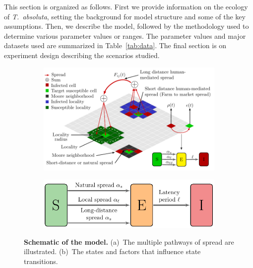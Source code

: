\documentclass[11pt]{article}
\newcommand{\tuta}{\emph{T.~absoluta}}
\theoremstyle{definition}
\begin{document}
This section is organized as follows. First we provide information on the
ecology of \tuta{}, setting the background for model structure and
some of the key assumptions. Then, we describe the model, followed by the
methodology used to determine various parameter values or ranges.  The
parameter values and major datasets used are summarized in
Table~\ref{tab:data}. The final section is on experiment design describing
the scenarios studied.
\begin{figure}[ht]
    \centering
    \begin{subfigure}[b]{.6\textwidth}
    \includegraphics[width=\textwidth]{figs/model_schematic.pdf}
    \caption{\label{fig:modelConcept}}
    \end{subfigure}
    \begin{subfigure}[b]{.37\textwidth}
    \includegraphics[width=\textwidth]{figs/SEI.pdf}
    \caption{\label{fig:SEI}}
    \end{subfigure}
    \caption{\textbf{Schematic of the model.} (a)~The multiple pathways of
    spread are illustrated. (b)~The states and factors that influence state
    transitions.}
\end{figure}
\end{document}

